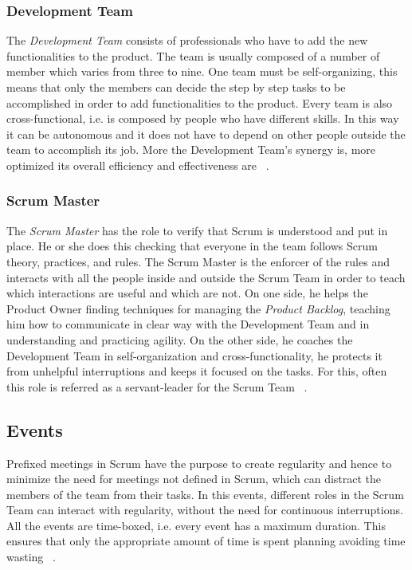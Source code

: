			\subsubsection{Development Team}\label{ref_scrum_dev_team}
			The \emph{Development Team} consists of professionals who have to add the new functionalities to the product. The team is usually composed of a number of member which varies from three to nine. One team must be self-organizing, this means that only the members can decide the step by step tasks to be accomplished in order to add functionalities to the product. Every team is also cross-functional, i.e. is composed by people who have different skills. In this way it can be autonomous and it does not have to depend on other people outside the team to accomplish its job. More the Development Team's synergy is, more optimized its overall efficiency and effectiveness are ~\cite{scrumEnglishGuide}.
 
			\subsubsection{Scrum Master}\label{ref_scrum_master}
			The \emph{Scrum Master} has the role to verify that Scrum is understood and put in place. He or she does this checking that everyone in the team follows Scrum theory, practices, and rules. 
			The Scrum Master is the enforcer of the rules and interacts with all the people inside and outside the Scrum Team in order to teach which interactions are useful and which are not.
			On one side, he helps the Product Owner finding techniques for managing the \emph{Product Backlog}, teaching him how to communicate in clear way with the Development Team and in understanding and practicing agility. On the other side, he coaches the Development Team in self-organization and cross-functionality, he protects it from unhelpful interruptions and keeps it focused on the tasks. 
			For this, often this role is referred as a servant-leader for the Scrum Team ~\cite{scrumEnglishGuide}.


		\subsection{Events}\label{ref_scrum_events}
			Prefixed meetings in Scrum have the purpose to create regularity and hence to minimize the need for meetings not defined in Scrum, which can distract the members of the team from their tasks. In this events, different roles in the Scrum Team can interact with regularity, without the need for continuous interruptions. All the events are time-boxed, i.e. every event has a maximum duration. This ensures that only the appropriate amount of time is spent planning avoiding time wasting ~\cite{scrumEnglishGuide}. 

